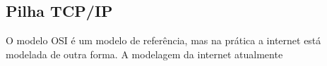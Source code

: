         \subsection{Pilha TCP/IP}
            O modelo OSI é um modelo de referência, mas na prática a internet está modelada de outra forma. A modelagem da internet atualmente
